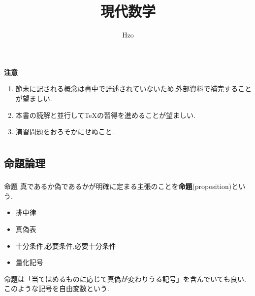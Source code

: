 \documentclass[dvipdfmx,b4j]{jsarticle}
\begin{document}
\title{現代数学}
\author{Hzo}
\maketitle

\begin{framed}
\textbf{注意}
\begin{enumerate}
    \item 節末に記される概念は書中で詳述されていないため,外部資料で補完することが望ましい.
    \item 本書の読解と並行して\TeX の習得を進めることが望ましい.
    \item 演習問題をおろそかにせぬこと.
\end{enumerate}
\end{framed}
\tableofcontents

\section{}
%
\subsection{命題論理}
\subsubsection{}
\begin{definition}{命題}{}
真であるか偽であるかが明確に定まる主張のことを\textbf{命題}(proposition)という.
\end{definition}
\begin{itemize}
  \item 排中律
  \item 真偽表
  \item 十分条件,必要条件,必要十分条件
  \item 量化記号
\end{itemize}

命題は「当てはめるものに応じて真偽が変わりうる記号」を含んでいても良い.このような記号を自由変数という.
%
\end{document}

